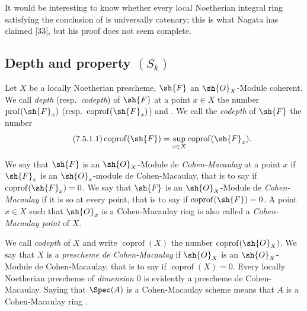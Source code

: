 \begin{example}[5.6.11]
It would be interesting to know whether every local Noetherian integral ring satisfying the conclusion of  is universally catenary; this is what Nagata has claimed [33], but his proof does not seem complete.
\end{example}

\subsection{Depth and property \texorpdfstring{$(S_k)$}{(Sk)}}
\label{subsection:IV.5.7}


\begin{definition}[5.7.1]
\label{IV.5.7.1}
Let $X$ be a locally Noetherian prescheme, $\sh{F}$ an $\sh{O}_X$-Module coherent.
We call \emph{depth} (resp.\ \emph{codepth}) of $\sh{F}$ at a point $x\in X$ the number $\operatorname{prof}(\sh{F}_x)$ (resp.\ $\operatorname{coprof}(\sh{F}_x)$)  and .
We call the \emph{codepth} of $\sh{F}$ the number
\[
\tag{7.5.1.1}\label{IV.7.5.1.1}
  \operatorname{coprof}(\sh{F}) = \sup_{x\in X}\operatorname{coprof}(\sh{F}_x).
\]

We say that $\sh{F}$ is an $\sh{O}_X$-Module de \emph{Cohen-Macaulay} at a point $x$ if $\sh{F}_x$ is an $\sh{O}_x$-module de Cohen-Macaulay, that is to say  if $\operatorname{coprof}(\sh{F}_x)=0$.
We say that $\sh{F}$ is an $\sh{O}_X$-Module de \emph{Cohen-Macaulay} if it is so at every point, that is to say if $\operatorname{coprof}(\sh{F})=0$.
A point $x\in X$ such that $\sh{O}_x$ is a Cohen-Macaulay ring is also called a \emph{Cohen-Macaulay point} of $X$.

We call \emph{codepth} of $X$ and write $\operatorname{coprof}(X)$ the number $\operatorname{coprof}(\sh{O}_X)$.
We say that $X$ is a \emph{prescheme de Cohen-Macaulay} if $\sh{O}_X$ is an $\sh{O}_X$-Module de Cohen-Macaulay, that is to say if $\operatorname{coprof}(X)=0$.
Every locally Noetherian prescheme of \emph{dimension} $0$ is evidently a prescheme de Cohen-Macaulay.
Saying that $\Spec(A)$ is a Cohen-Macaulay scheme means that $A$ is a Cohen-Macaulay ring .
\end{definition}

